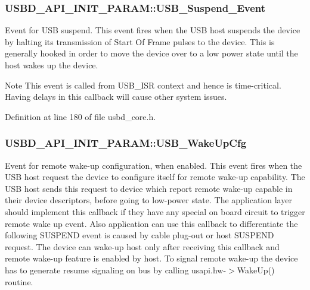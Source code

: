 \subsubsection[{\texorpdfstring{U\+S\+B\+\_\+\+Suspend\+\_\+\+Event}{USB_Suspend_Event}}]{ U\+S\+B\+D\+\_\+\+A\+P\+I\+\_\+\+I\+N\+I\+T\+\_\+\+P\+A\+R\+A\+M\+::\+U\+S\+B\+\_\+\+Suspend\+\_\+\+Event}\hypertarget{structUSBD__API__INIT__PARAM_a3c256417cf3bdd576029d29787d6046f}{}\label{structUSBD__API__INIT__PARAM_a3c256417cf3bdd576029d29787d6046f}
Event for U\+SB suspend. This event fires when the U\+SB host suspends the device by halting its transmission of Start Of Frame pulses to the device. This is generally hooked in order to move the device over to a low power state until the host wakes up the device. ~\newline
\begin{DoxyNote}{Note}
This event is called from U\+S\+B\+\_\+\+I\+SR context and hence is time-\/critical. Having delays in this callback will cause other system issues. 
\end{DoxyNote}


Definition at line 180 of file usbd\+\_\+core.\+h.

\subsubsection[{\texorpdfstring{U\+S\+B\+\_\+\+Wake\+Up\+Cfg}{USB_WakeUpCfg}}]{ U\+S\+B\+D\+\_\+\+A\+P\+I\+\_\+\+I\+N\+I\+T\+\_\+\+P\+A\+R\+A\+M\+::\+U\+S\+B\+\_\+\+Wake\+Up\+Cfg}\hypertarget{structUSBD__API__INIT__PARAM_a3166b630a5aa02ca07bd3df8496aba5b}{}\label{structUSBD__API__INIT__PARAM_a3166b630a5aa02ca07bd3df8496aba5b}
Event for remote wake-\/up configuration, when enabled. This event fires when the U\+SB host request the device to configure itself for remote wake-\/up capability. The U\+SB host sends this request to device which report remote wake-\/up capable in their device descriptors, before going to low-\/power state. The application layer should implement this callback if they have any special on board circuit to trigger remote wake up event. Also application can use this callback to differentiate the following S\+U\+S\+P\+E\+ND event is caused by cable plug-\/out or host S\+U\+S\+P\+E\+ND request. The device can wake-\/up host only after receiving this callback and remote wake-\/up feature is enabled by host. To signal remote wake-\/up the device has to generate resume signaling on bus by calling usapi.\+hw-\/$>$Wake\+Up() routine.

